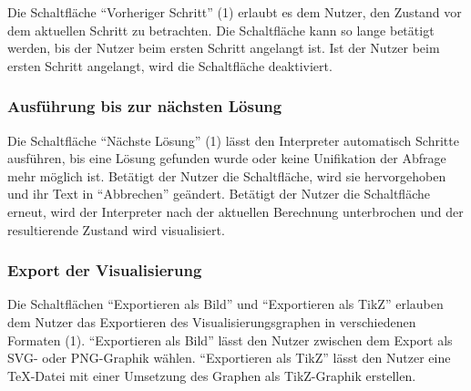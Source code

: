 \documentclass[parskip=full,11pt,twoside]{scrartcl}
\begin{document}
Die Schaltfläche \enquote{Vorheriger Schritt} (1) erlaubt es dem Nutzer, den Zustand vor dem aktuellen Schritt zu betrachten.
Die Schaltfläche kann so lange betätigt werden, bis der Nutzer beim ersten Schritt angelangt ist.
Ist der Nutzer beim ersten Schritt angelangt, wird die Schaltfläche deaktiviert.

\subsubsection{Ausführung bis zur nächsten Lösung}

\begin{minipage}{\linewidth}
\end{minipage}

\begin{minipage}{\linewidth}
\end{minipage}

Die Schaltfläche \enquote{Nächste Lösung} (1) lässt den Interpreter automatisch Schritte ausführen, bis eine Lösung gefunden wurde oder keine Unifikation der Abfrage mehr möglich ist.
Betätigt der Nutzer die Schaltfläche, wird sie hervorgehoben und ihr Text in \enquote{Abbrechen} geändert.
Betätigt der Nutzer die Schaltfläche erneut, wird der Interpreter nach der aktuellen Berechnung unterbrochen und der resultierende Zustand wird visualisiert.

\subsubsection{Export der Visualisierung}

\begin{minipage}{\linewidth}
\end{minipage}

Die Schaltflächen \enquote{Exportieren als Bild} und \enquote{Exportieren als TikZ} erlauben dem Nutzer das Exportieren des Visualisierungsgraphen in verschiedenen Formaten (1).
\enquote{Exportieren als Bild} lässt den Nutzer zwischen dem Export als SVG- oder PNG-Graphik wählen.
\enquote{Exportieren als TikZ} lässt den Nutzer eine TeX-Datei mit einer Umsetzung des Graphen als TikZ-Graphik erstellen.
\end{document}
